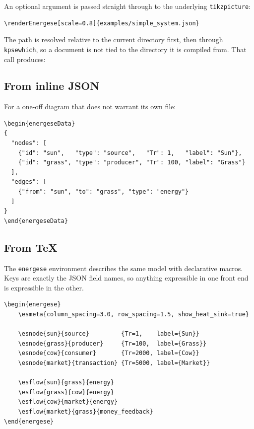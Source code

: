 \documentclass{article}
\begin{document}
An optional argument is passed straight through to the underlying
\texttt{tikzpicture}:

\begin{verbatim}
\renderEnergese[scale=0.8]{examples/simple_system.json}
\end{verbatim}

The path is resolved relative to the current directory first, then through
\texttt{kpsewhich}, so a document is not tied to the directory it is compiled
from. That call produces:

\begin{center}
\end{center}

\subsection{From inline JSON}

For a one-off diagram that does not warrant its own file:

\begin{verbatim}
\begin{energeseData}
{
  "nodes": [
    {"id": "sun",   "type": "source",   "Tr": 1,   "label": "Sun"},
    {"id": "grass", "type": "producer", "Tr": 100, "label": "Grass"}
  ],
  "edges": [
    {"from": "sun", "to": "grass", "type": "energy"}
  ]
}
\end{energeseData}
\end{verbatim}

\subsection{From \TeX}

The \texttt{energese} environment describes the same model with declarative
macros. Keys are exactly the JSON field names, so anything expressible in one
front end is expressible in the other.

\begin{verbatim}
\begin{energese}
    \esmeta{column_spacing=3.0, row_spacing=1.5, show_heat_sink=true}

    \esnode{sun}{source}         {Tr=1,    label={Sun}}
    \esnode{grass}{producer}     {Tr=100,  label={Grass}}
    \esnode{cow}{consumer}       {Tr=2000, label={Cow}}
    \esnode{market}{transaction} {Tr=5000, label={Market}}

    \esflow{sun}{grass}{energy}
    \esflow{grass}{cow}{energy}
    \esflow{cow}{market}{energy}
    \esflow{market}{grass}{money_feedback}
\end{energese}
\end{verbatim}
\end{document}
